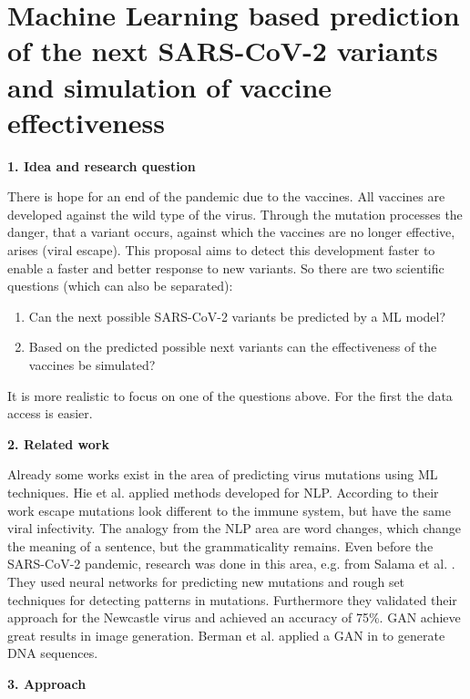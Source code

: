 \section{Machine Learning based prediction of the next SARS-CoV-2 variants and simulation of vaccine effectiveness} \label{proposal1}

\textbf{1. Idea and research question}

There is hope for an end of the pandemic due to the vaccines. All vaccines are developed against the wild type of the virus. Through the mutation processes the danger, that a variant occurs, against which the vaccines  are no longer effective, arises (viral escape). This proposal aims to detect this development faster to enable a faster and better response to new variants. So there are two scientific questions (which can also be separated):

\begin{enumerate}
	\item Can the next possible SARS-CoV-2 variants be predicted by a \ac{ML} model?
	\item Based on the  predicted possible next variants can the effectiveness of the vaccines be simulated?
\end{enumerate}

\color{green}
It is more realistic to focus on one of the questions above. For the first the data access is easier.
\color{black}

\textbf{2. Related work}

Already some works exist in the area of predicting virus mutations using \ac{ML} techniques. Hie et al. \cite{Hie2021} applied methods developed for \ac{NLP}.  According to their work escape mutations look different to the immune system, but have the same viral infectivity. The analogy from the \ac{NLP} area are word changes, which change the meaning of a sentence, but the grammaticality remains. %
Even before the SARS-CoV-2 pandemic, research was done in this area, e.g. from Salama et al. \cite{Salama2016}. They used neural networks for predicting new mutations and rough set techniques for detecting patterns in mutations. Furthermore they validated their approach for the Newcastle virus and achieved an accuracy of 75\%. \ac{GAN} achieve great results in image generation. Berman et al. applied a \ac{GAN} in \cite{Berman2020} to generate \ac{DNA} sequences.

\textbf{3. Approach}

